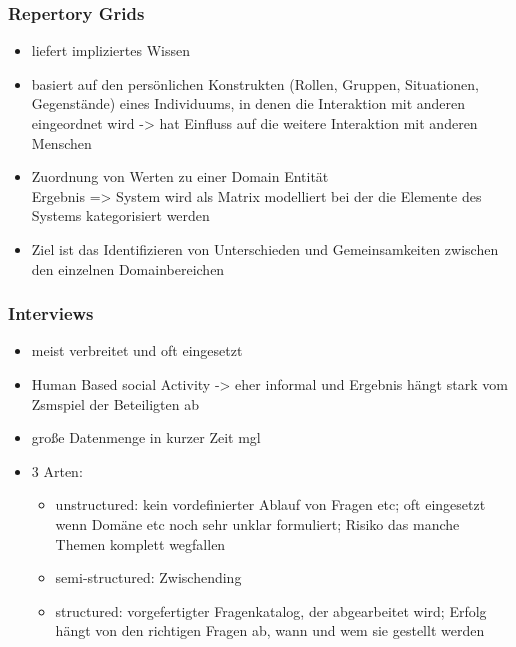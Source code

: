 \subsubsection{Repertory Grids}
\begin{itemize}
	\item liefert impliziertes Wissen
	\item basiert auf den persönlichen Konstrukten (Rollen, Gruppen, Situationen, Gegenstände) eines Individuums, in denen die Interaktion mit anderen eingeordnet wird -> hat Einfluss auf die weitere Interaktion mit anderen Menschen
	\item Zuordnung von Werten zu einer Domain Entität\\
	Ergebnis => System wird als Matrix modelliert bei der die Elemente des Systems kategorisiert werden
	\item Ziel ist das Identifizieren von Unterschieden und Gemeinsamkeiten zwischen den einzelnen Domainbereichen
\end{itemize}

\subsubsection{Interviews}
\begin{itemize}
	\item meist verbreitet und oft eingesetzt
	\item Human Based social Activity -> eher informal und Ergebnis hängt stark vom Zsmspiel der Beteiligten ab
	\item große Datenmenge in kurzer Zeit mgl
	\item 3 Arten:
	\begin{itemize}
		\item unstructured: kein vordefinierter Ablauf von Fragen etc; oft eingesetzt wenn Domäne etc noch sehr unklar formuliert; Risiko das manche Themen komplett wegfallen
		\item semi-structured: Zwischending
		\item structured: vorgefertigter Fragenkatalog, der abgearbeitet wird; Erfolg hängt von den richtigen Fragen ab, wann und wem sie gestellt werden
	\end{itemize}
\end{itemize}

